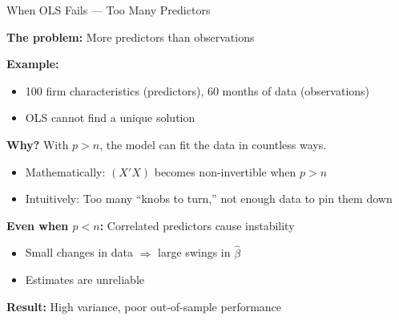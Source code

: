 \documentclass[10pt]{beamer}
\newcommand{\highlight}[1]{\textcolor{AccentOrange}{\textbf{#1}}}
\begin{document}
\begin{frame}{When OLS Fails --- Too Many Predictors}

\textbf{The problem:} More predictors than observations

\vspace{0.5em}
\textbf{Example:} 
\begin{itemize}
  \item 100 firm characteristics (predictors), 60 months of data (observations)
  \item OLS cannot find a unique solution
\end{itemize}

\vspace{1em}
\textbf{Why?} With $p>n$, the model can fit the data in countless ways.
\begin{itemize}
  \item Mathematically: $(X'X)$ becomes non-invertible when $p > n$
  \item Intuitively: Too many ``knobs to turn,'' not enough data to pin them down
\end{itemize}

\vspace{1em}
\textbf{Even when $p < n$:} Correlated predictors cause instability
\begin{itemize}
  \item Small changes in data $\Rightarrow$ large swings in $\widehat{\beta}$
  \item Estimates are unreliable 
\end{itemize}

\vspace{1em}
\highlight{Result:} High variance, poor out-of-sample performance

\end{frame}

\end{document}
